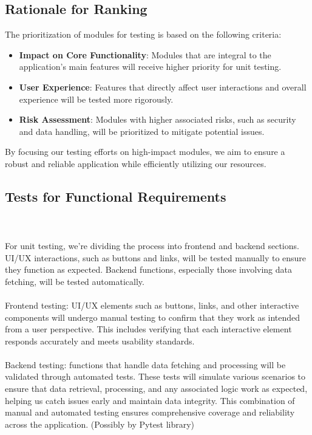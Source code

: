 \documentclass[12pt, titlepage]{article}
\begin{document}
\subsection{Rationale for Ranking}
The prioritization of modules for testing is based on the following criteria:
\begin{itemize}
    \item \textbf{Impact on Core Functionality}: Modules that are integral to the application’s main features will receive higher priority for unit testing.
    \item \textbf{User Experience}: Features that directly affect user interactions and overall experience will be tested more rigorously.
    \item \textbf{Risk Assessment}: Modules with higher associated risks, such as security and data handling, will be prioritized to mitigate potential issues.
\end{itemize}

By focusing our testing efforts on high-impact modules, we aim to ensure a robust and reliable application while efficiently utilizing our resources.


\subsection{Tests for Functional Requirements}

\\\\
For unit testing, we’re dividing the process into frontend and backend sections. UI/UX interactions, such as buttons and links, will be tested manually to ensure they function as expected. Backend functions, especially those involving data fetching, will be tested automatically.\\\\
Frontend testing: UI/UX elements such as buttons, links, and other interactive components will undergo manual testing to confirm that they work as intended from a user perspective. This includes verifying that each interactive element responds accurately and meets usability standards.\\\\
Backend testing: functions that handle data fetching and processing will be validated through automated tests. These tests will simulate various scenarios to ensure that data retrieval, processing, and any associated logic work as expected, helping us catch issues early and maintain data integrity. This combination of manual and automated testing ensures comprehensive coverage and reliability across the application. (Possibly by Pytest library)
\end{document}
